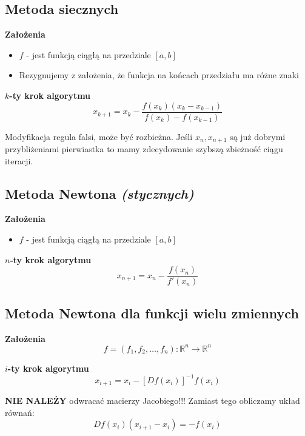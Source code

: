 \documentclass[../mn-notatki.tex]{subfiles}
\begin{document}
\subsection{Metoda siecznych}

\begin{tcolorbox}
\textbf{Założenia}
\begin{itemize}
    \item $f$ - jest funkcją ciągłą na przedziale $[a,b]$
    \item Rezygnujemy z założenia, że funkcja na końcach przedziału ma różne znaki\\
\end{itemize}

\textbf{$k$-ty krok algorytmu}
\[
x_{k+1} = x_k - \frac{f(x_k)(x_k - x_{k-1})}{f(x_k) - f(x_{k-1})}
\]
\end{tcolorbox}

Modyfikacja regula falsi, może być rozbieżna. Jeśli $x_n, x_{n+1}$ są już
dobrymi przybliżeniami pierwiastka to mamy zdecydowanie szybszą zbieżność ciągu
iteracji.

\subsection{Metoda Newtona \textit{(stycznych)}}

\begin{tcolorbox}
\textbf{Założenia}
\begin{itemize}
    \item $f$ - jest funkcją ciągłą na przedziale $[a,b]$
\end{itemize}

\textbf{$n$-ty krok algorytmu}
\[
x_{n+1} = x_n - \frac{f(x_n)}{f'(x_n)}
\]
\end{tcolorbox}


\subsection{Metoda Newtona dla funkcji wielu zmiennych}

\begin{tcolorbox}
\textbf{Założenia}
\[
f = (f_1, f_2, \ldots, f_n) : \mathbb{R}^n \rightarrow \mathbb{R}^n
\]

\textbf{$i$-ty krok algorytmu}
\[
x_{i+1} = x_i - \left[ D f(x_i) \right]^{-1} f(x_i)
\]

\textbf{NIE NALEŻY} odwracać macierzy Jacobiego!!!
Zamiast tego obliczamy układ równań:
\[
D f(x_i) (x_{i+1} - x_i) = -f(x_i)
\]
\end{tcolorbox}
\end{document}
